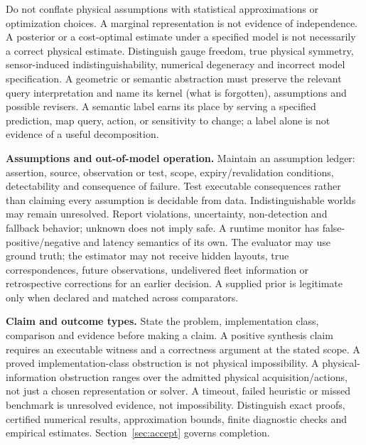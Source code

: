 \documentclass[11pt,letterpaper]{article}
\begin{document}
Do not conflate physical assumptions with statistical approximations or optimization choices. A marginal representation is not evidence of independence. A posterior or a cost-optimal estimate under a specified model is not necessarily a correct physical estimate. Distinguish gauge freedom, true physical symmetry, sensor-induced indistinguishability, numerical degeneracy and incorrect model specification. A geometric or semantic abstraction must preserve the relevant query interpretation and name its kernel (what is forgotten), assumptions and possible revisers. A semantic label earns its place by serving a specified prediction, map query, action, or sensitivity to change; a label alone is not evidence of a useful decomposition.

\textbf{Assumptions and out-of-model operation.} Maintain an assumption ledger: assertion, source, observation or test, scope, expiry/revalidation conditions, detectability and consequence of failure. Test executable consequences rather than claiming every assumption is decidable from data. Indistinguishable worlds may remain unresolved. Report violations, uncertainty, non-detection and fallback behavior; unknown does not imply safe. A runtime monitor has false-positive/negative and latency semantics of its own. The evaluator may use ground truth; the estimator may not receive hidden layouts, true correspondences, future observations, undelivered fleet information or retrospective corrections for an earlier decision. A supplied prior is legitimate only when declared and matched across comparators.

\textbf{Claim and outcome types.} State the problem, implementation class, comparison and evidence before making a claim. A positive synthesis claim requires an executable witness and a correctness argument at the stated scope. A proved implementation-class obstruction is not physical impossibility. A physical-information obstruction ranges over the admitted physical acquisition/actions, not just a chosen representation or solver. A timeout, failed heuristic or missed benchmark is unresolved evidence, not impossibility. Distinguish exact proofs, certified numerical results, approximation bounds, finite diagnostic checks and empirical estimates. Section~\ref{sec:accept} governs completion.
\end{document}
